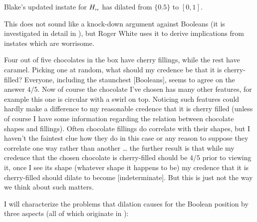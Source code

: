 \documentclass[11pt]{article}
\begin{document}
Blake's updated instate for $H_{\mbox{\tiny{iv}}}$ has dilated from
$\{0.5\}$ to $[0,1]$.

This does not sound like a knock-down argument against Booleans (it is
investigated in detail in ), but
Roger White uses it to derive implications from instates which are
worrisome.

\begin{quotex}
  \label{ex:chocolates} Four out of five
  chocolates in the box have cherry fillings, while the rest have
  caramel. Picking one at random, what should my credence be that it
  is cherry-filled? Everyone, including the staunchest [Booleans],
  seems to agree on the answer $4/5$. Now of course the chocolate I've
  chosen has many other features, for example this one is circular
  with a swirl on top. Noticing such features could hardly make a
  difference to my reasonable credence that it is cherry filled
  (unless of course I have some information regarding the relation
  between chocolate shapes and fillings). Often chocolate fillings do
  correlate with their shapes, but I haven't the faintest clue how
  they do in this case or any reason to suppose they correlate one way
  rather than another {\ldots} the further result is that while my
  credence that the chosen chocolate is cherry-filled should be $4/5$
  prior to viewing it, once I see its shape (whatever shape it happens
  to be) my credence that it is cherry-filled should dilate to become
  [indeterminate]. But this is just not the way we think about such
  matters. 
\end{quotex}

I will characterize the problems that dilation causes for the Boolean
position by three aspects (all of which originate in
):
\end{document}
